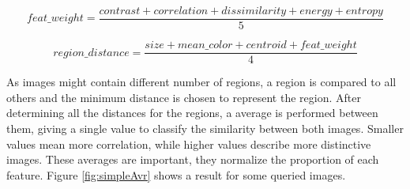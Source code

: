 \documentclass[12pt,a4paper]{article}
\begin{document}
\begin{equation}
	feat\_weight =  \frac{contrast + correlation + dissimilarity +  energy + entropy}{5}
	\label{eq:dist_avr}
\end{equation}

\begin{equation}
region\_distance =  \frac{size + mean\_color + centroid +  feat\_weight}{4}
\label{eq:feat_avr}
\end{equation}

As images might contain different number of regions, a region is compared to all others and the minimum distance is chosen to represent the region. After determining all the distances for the regions, a average is performed between them, giving a single value to classify the similarity between both images. Smaller values mean more correlation, while higher values describe more distinctive images. These averages are important, they normalize the proportion of each feature. Figure \ref{fig:simpleAvr} shows a result for some queried images. \\
\end{document}
